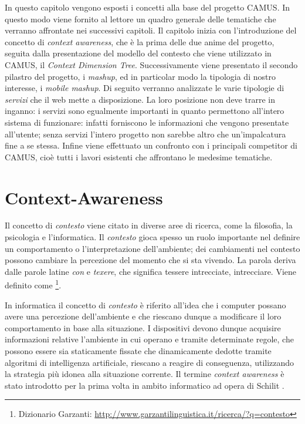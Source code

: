 In questo capitolo vengono esposti i concetti alla base del progetto CAMUS. In questo modo viene fornito al lettore un quadro generale delle tematiche che verranno affrontate nei successivi capitoli. Il capitolo inizia con l'introduzione del concetto di \emph{context awareness}, che è la prima delle due anime del progetto, seguita dalla presentazione del modello del contesto che viene utilizzato in CAMUS, il \emph{Context Dimension Tree}. Successivamente viene presentato il secondo pilastro del progetto, i \emph{mashup}, ed in particolar modo la tipologia di nostro interesse, i \emph{mobile mashup}. Di seguito verranno analizzate le varie tipologie di \emph{servizi} che il web mette a disposizione. La loro posizione non deve trarre in inganno: i servizi sono egualmente importanti in quanto permettono all'intero sistema di funzionare: infatti forniscono le informazioni che vengono presentate all'utente; senza servizi l'intero progetto non sarebbe altro che un'impalcatura fine a se stessa. Infine viene effettuato un confronto con i principali competitor di CAMUS, cioè tutti i lavori esistenti che affrontano le medesime tematiche.

\section{Context-Awareness\label{sec:context-awareness}}

Il concetto di \emph{contesto} viene citato in diverse aree di ricerca, come la filosofia, la psicologia e l'informatica. Il \emph{contesto} gioca spesso un ruolo importante nel definire un comportamento o l'interpretazione dell'ambiente; dei cambiamenti nel contesto possono cambiare la percezione del momento che si sta vivendo. La parola  deriva dalle parole latine \emph{con} e \emph{texere}, che significa tessere intrecciate, intrecciare. Viene definito come \footnote{Dizionario Garzanti: \url{http://www.garzantilinguistica.it/ricerca/?q=contesto}}.

In informatica il concetto di \emph{contesto} è riferito all'idea che i computer possano avere una percezione dell'ambiente e che riescano dunque a modificare il loro comportamento in base alla situazione. I dispositivi devono dunque acquisire informazioni relative l'ambiente in cui operano e tramite determinate regole, che possono essere sia staticamente fissate che dinamicamente dedotte tramite algoritmi di intelligenza artificiale, riescano a reagire di conseguenza, utilizzando la strategia più idonea alla situazione corrente. Il termine \emph{context awareness} è stato introdotto per la prima volta in ambito informatico ad opera di Schilit \cite{schilit1994context}\cite{schilit1994disseminating}.

